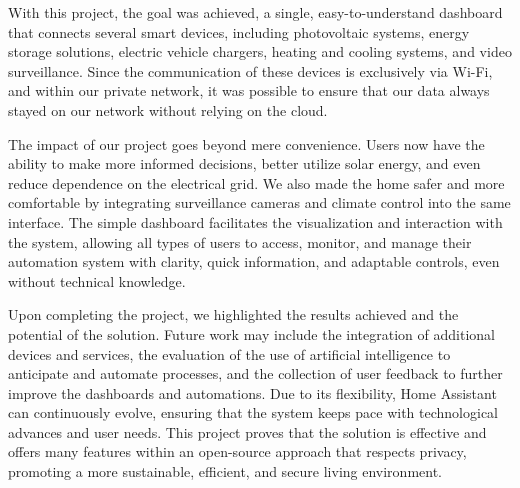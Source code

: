 \documentclass[graybox]{svmult}
\begin{document}
With this project, the goal was achieved, a single, easy-to-understand dashboard that connects several smart devices, including photovoltaic systems, energy storage solutions, electric vehicle chargers, heating and cooling systems, and video surveillance. Since the communication of these devices is exclusively via Wi-Fi, and within our private network, it was possible to ensure that our data always stayed on our network without relying on the cloud.

The impact of our project goes beyond mere convenience. Users now have the ability to make more informed decisions, better utilize solar energy, and even reduce dependence on the electrical grid. We also made the home safer and more comfortable by integrating surveillance cameras and climate control into the same interface. The simple dashboard facilitates the visualization and interaction with the system, allowing all types of users to access, monitor, and manage their automation system with clarity, quick information, and adaptable controls, even without technical knowledge.

Upon completing the project, we highlighted the results achieved and the potential of the solution. Future work may include the integration of additional devices and services, the evaluation of the use of artificial intelligence to anticipate and automate processes, and the collection of user feedback to further improve the dashboards and automations. Due to its flexibility, Home Assistant can continuously evolve, ensuring that the system keeps pace with technological advances and user needs. This project proves that the solution is effective and offers many features within an open-source approach that respects privacy, promoting a more sustainable, efficient, and secure living environment.



\nocite{*}




%
\end{document}
